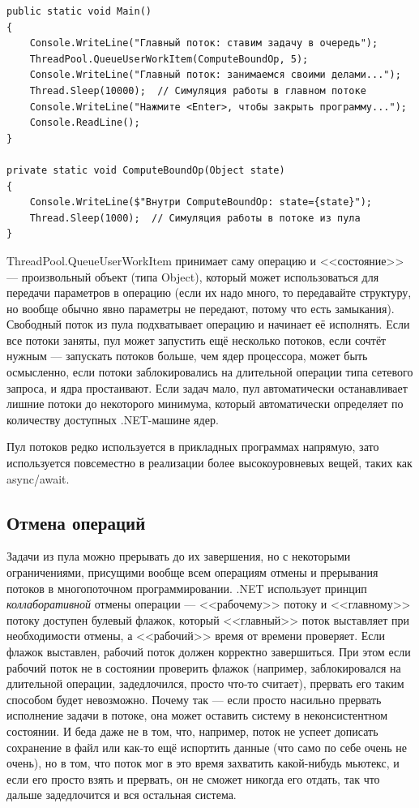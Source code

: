 \documentclass{../../text-style}
\begin{document}
\begin{verbatim}
public static void Main() 
{
    Console.WriteLine("Главный поток: ставим задачу в очередь");
    ThreadPool.QueueUserWorkItem(ComputeBoundOp, 5);
    Console.WriteLine("Главный поток: занимаемся своими делами...");
    Thread.Sleep(10000);  // Симуляция работы в главном потоке
    Console.WriteLine("Нажмите <Enter>, чтобы закрыть программу...");
    Console.ReadLine();
}

private static void ComputeBoundOp(Object state) 
{
    Console.WriteLine($"Внутри ComputeBoundOp: state={state}");
    Thread.Sleep(1000);  // Симуляция работы в потоке из пула
}
\end{verbatim}

ThreadPool.QueueUserWorkItem принимает саму операцию и <<состояние>> --- произвольный объект (типа Object), который может использоваться для передачи параметров в операцию (если их надо много, то передавайте структуру, но вообще обычно явно параметры не передают, потому что есть замыкания). Свободный поток из пула подхватывает операцию и начинает её исполнять. Если все потоки заняты, пул может запустить ещё несколько потоков, если сочтёт нужным --- запускать потоков больше, чем ядер процессора, может быть осмысленно, если потоки заблокировались на длительной операции типа сетевого запроса, и ядра простаивают. Если задач мало, пул автоматически останавливает лишние потоки до некоторого минимума, который автоматически определяет по количеству доступных .NET-машине ядер.

Пул потоков редко используется в прикладных программах напрямую, зато используется повсеместно в реализации более высокоуровневых вещей, таких как async/await.

\subsection{Отмена операций}

Задачи из пула можно прерывать до их завершения, но с некоторыми ограничениями, присущими вообще всем операциям отмены и прерывания потоков в многопоточном программировании. .NET использует принцип \textit{коллаборативной} отмены операции --- <<рабочему>> потоку и <<главному>> потоку доступен булевый флажок, который <<главный>> поток выставляет при необходимости отмены, а <<рабочий>> время от времени проверяет. Если флажок выставлен, рабочий поток должен корректно завершиться. При этом если рабочий поток не в состоянии проверить флажок (например, заблокировался на длительной операции, задедлочился, просто что-то считает), прервать его таким способом будет невозможно. Почему так --- если просто насильно прервать исполнение задачи в потоке, она может оставить систему в неконсистентном состоянии. И беда даже не в том, что, например, поток не успеет дописать сохранение в файл или как-то ещё испортить данные (что само по себе очень не очень), но в том, что поток мог в это время захватить какой-нибудь мьютекс, и если его просто взять и прервать, он не сможет никогда его отдать, так что дальше задедлочится и вся остальная система. 
\end{document}
